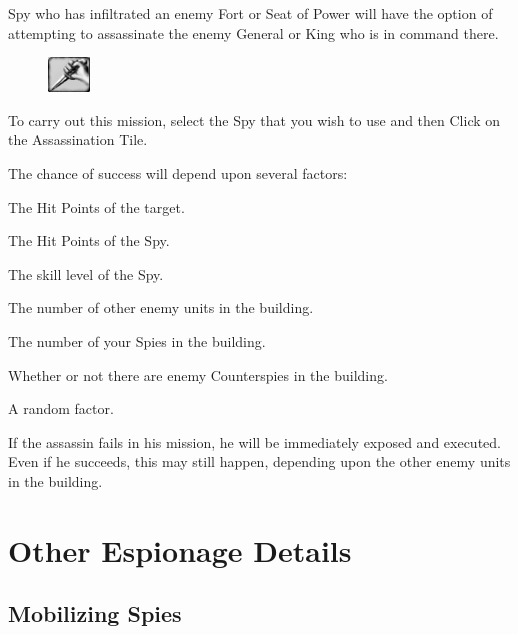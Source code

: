 
 Spy who has infiltrated an enemy Fort or Seat of Power will have the option of attempting to assassinate the enemy General or King who is in command there.

\begin{figure}
	\vspace{-20pt}
	\begin{center}
		\includegraphics[width=0.1\textwidth]{Tassinate}
	\end{center}
	\vspace{-20pt}
\end{figure}

To carry out this mission, select the Spy that you wish to use and then Click on the Assassination Tile.

\begin{changemargin}{.5cm}{0cm}
The chance of success will depend upon several factors:

The Hit Points of the target.

The Hit Points of the Spy.

The skill level of the Spy.

The number of other enemy units in the building.

The number of your Spies in the building.

Whether or not there are enemy Counterspies in the building.

A random factor.
\end{changemargin}

If the assassin fails in his mission, he will be immediately exposed and executed. Even if he succeeds, this may still happen, depending upon the other enemy units in the building.

\section{Other Espionage Details}

\subsection{Mobilizing Spies}


